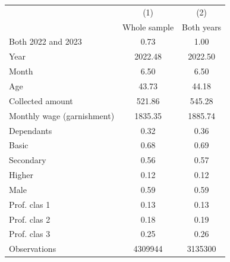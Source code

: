 {
\def\sym#1{\ifmmode^{#1}\else\(^{#1}\)\fi}
\begin{tabular}{l*{2}{c}}
\hline\hline
                    &\multicolumn{1}{c}{(1)}&\multicolumn{1}{c}{(2)}\\
                    &        Whole sample & Both years\\
\hline
Both 2022 and 2023  &        0.73&        1.00\\
Year                &     2022.48&     2022.50\\
Month               &        6.50&        6.50\\
Age                 &       43.73&       44.18\\
Collected amount    &      521.86&      545.28\\
Monthly wage (garnishment)&     1835.35&     1885.74\\
Dependants          &        0.32&        0.36\\
Basic               &        0.68&        0.69\\
Secondary           &        0.56&        0.57\\
Higher              &        0.12&        0.12\\
Male                &        0.59&        0.59\\
Prof. clas 1        &        0.13&        0.13\\
Prof. clas 2        &        0.18&        0.19\\
Prof. clas 3        &        0.25&        0.26\\
\hline
Observations        &     4309944&     3135300\\
\hline\hline
\end{tabular}
}
